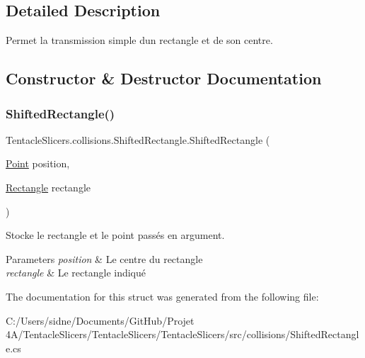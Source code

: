 \subsection{Detailed Description}
Permet la transmission simple d\textquotesingle{}un rectangle et de son centre. 



\subsection{Constructor \& Destructor Documentation}
\mbox{\label{struct_tentacle_slicers_1_1collisions_1_1_shifted_rectangle_af9ab898f093c9953cbef4efa966ab5f8}} 
\subsubsection{\texorpdfstring{Shifted\+Rectangle()}{ShiftedRectangle()}}
{\footnotesize\ttfamily Tentacle\+Slicers.\+collisions.\+Shifted\+Rectangle.\+Shifted\+Rectangle (\begin{DoxyParamCaption}\item[{\hyperlink{class_tentacle_slicers_1_1general_1_1_point}{Point}}]{position,  }\item[{\hyperlink{class_tentacle_slicers_1_1collisions_1_1_rectangle}{Rectangle}}]{rectangle }\end{DoxyParamCaption})}



Stocke le rectangle et le point passés en argument. 


\begin{DoxyParams}{Parameters}
{\em position} & Le centre du rectangle \\
\hline
{\em rectangle} & Le rectangle indiqué \\
\hline
\end{DoxyParams}


The documentation for this struct was generated from the following file\+:\begin{DoxyCompactItemize}
\item 
C\+:/\+Users/sidne/\+Documents/\+Git\+Hub/\+Projet 4\+A/\+Tentacle\+Slicers/\+Tentacle\+Slicers/\+Tentacle\+Slicers/src/collisions/Shifted\+Rectangle.\+cs\end{DoxyCompactItemize}
